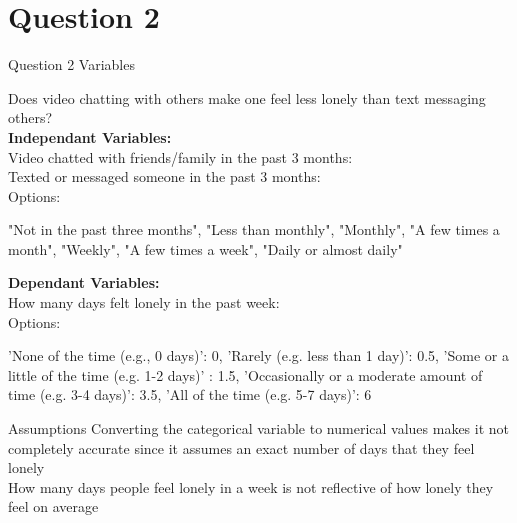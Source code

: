 \documentclass{beamer}
\begin{document}
\section{Question 2}
\begin{frame}{Question 2 Variables}

Does video chatting with others make one feel less lonely than text messaging others?\\

\textbf{Independant Variables:}\\

Video chatted with friends/family in the past 3 months:\\

Texted or messaged someone in the past 3 months:\\

Options:
\begin{itemize}
    "Not in the past three months",
    "Less than monthly",
    "Monthly",
    "A few times a month",
    "Weekly",
    "A few times a week",
    "Daily or almost daily"
\end{itemize}

\textbf{Dependant Variables:}\\

How many days felt lonely in the past week:\\

Options:
\begin{itemize}
'None of the time (e.g., 0 days)': 0,
    'Rarely (e.g. less than 1 day)': 0.5,
    'Some or a little of the time (e.g. 1-2 days)' : 1.5,
    'Occasionally or a moderate amount of time (e.g. 3-4 days)': 3.5,
    'All of the time (e.g. 5-7 days)': 6
\end{itemize}
\end{frame}

\begin{frame}{Assumptions}
Converting the categorical variable to numerical values makes it not completely accurate since it assumes an exact number of days that they feel lonely\\


How many days people feel lonely in a week is not reflective of how lonely they feel on average\\
\end{frame}
\end{document}
